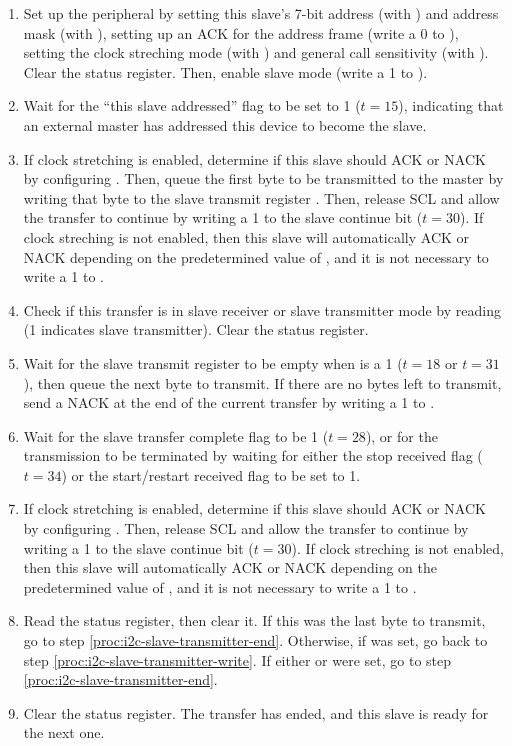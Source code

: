 \begin{enumerate}
	\item Set up the  peripheral by setting this slave's 7-bit address (with ) and address mask (with ), setting up an ACK for the address frame (write a 0 to ), setting the clock streching mode (with ) and general call sensitivity (with ). Clear the status register. Then, enable slave mode (write a 1 to ).
	\item Wait for the ``this slave addressed'' flag  to be set to 1 ($t = 15$), indicating that an external master has addressed this device to become the slave.
	\item If clock stretching is enabled, determine if this slave should ACK or NACK by configuring . Then, queue the first byte to be transmitted to the master by writing that byte to the slave transmit register . Then, release SCL and allow the transfer to continue by writing a 1 to the slave continue bit  ($t = 30$). If clock streching is not enabled, then this slave will automatically ACK or NACK depending on the predetermined value of , and it is not necessary to write a 1 to .
	\item Check if this transfer is in slave receiver or slave transmitter mode by reading  (1 indicates slave transmitter). Clear the status register.
	\item \label{proc:i2c-slave-transmitter-write} Wait for the slave transmit register to be empty when  is a 1 ($t = 18$ or $t = 31$), then queue the next byte to transmit. If there are no bytes left to transmit, send a NACK at the end of the current transfer by writing a 1 to .
	\item \label{proc:i2c-slave-transmitter-wait} Wait for the slave transfer complete flag  to be 1 ($t = 28$), or for the transmission to be terminated by waiting for either the stop received flag  ($t = 34$) or the start/restart received flag  to be set to 1.
	\item If clock stretching is enabled, determine if this slave should ACK or NACK by configuring . Then, release SCL and allow the transfer to continue by writing a 1 to the slave continue bit  ($t = 30$). If clock streching is not enabled, then this slave will automatically ACK or NACK depending on the predetermined value of , and it is not necessary to write a 1 to .
	\item Read the status register, then clear it. If this was the last byte to transmit, go to step \ref{proc:i2c-slave-transmitter-end}. Otherwise, if  was set, go back to step \ref{proc:i2c-slave-transmitter-write}. If either  or  were set, go to step \ref{proc:i2c-slave-transmitter-end}.
	\item \label{proc:i2c-slave-transmitter-end} Clear the status register. The transfer has ended, and this slave is ready for the next one.
\end{enumerate}
